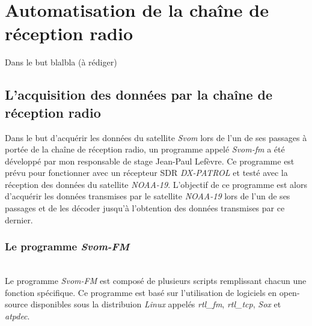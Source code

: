 \documentclass[12pt,fleqn]{book} %
\begin{document}
\part{Automatisation de la chaîne de réception radio}
Dans le but blalbla (à rédiger)
\chapter{L'acquisition des données par la chaîne de réception radio}
Dans le but d'acquérir les données du satellite \emph{Svom} lors de l'un de ses passages à portée de la chaîne de réception radio, un programme appelé \emph{Svom-fm} a été développé par mon responsable de stage Jean-Paul Lefèvre. Ce programme est prévu pour fonctionner avec un récepteur SDR \emph{DX-PATROL} et testé avec la réception des données du satellite \emph{NOAA-19}. L'objectif de ce programme est alors d'acquérir les données transmises par le satellite \emph{NOAA-19} lors de l'un de ses passages et de les décoder jusqu'à l'obtention des données transmises par ce dernier.
\section{Le programme \emph{Svom-FM}}
~\\\indent Le programme \emph{Svom-FM} est composé de plusieurs scripts remplissant chacun une fonction spécifique. Ce programme est basé sur l'utilisation de logiciels en open-source disponibles sous la distribuion \emph{Linux} appelés \emph{rtl\_fm}, \emph{rtl\_tcp}, \emph{Sox} et \emph{atpdec}.
\end{document}
